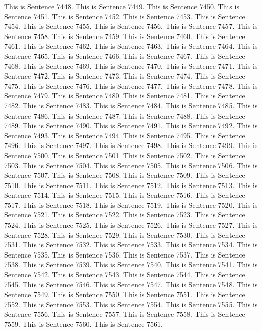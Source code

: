 \documentclass{article}
\begin{document}
This is Sentence 7448.
This is Sentence 7449.
This is Sentence 7450.
This is Sentence 7451.
This is Sentence 7452.
This is Sentence 7453.
This is Sentence 7454.
This is Sentence 7455.
This is Sentence 7456.
This is Sentence 7457.
This is Sentence 7458.
This is Sentence 7459.
This is Sentence 7460.
This is Sentence 7461.
This is Sentence 7462.
This is Sentence 7463.
This is Sentence 7464.
This is Sentence 7465.
This is Sentence 7466.
This is Sentence 7467.
This is Sentence 7468.
This is Sentence 7469.
This is Sentence 7470.
This is Sentence 7471.
This is Sentence 7472.
This is Sentence 7473.
This is Sentence 7474.
This is Sentence 7475.
This is Sentence 7476.
This is Sentence 7477.
This is Sentence 7478.
This is Sentence 7479.
This is Sentence 7480.
This is Sentence 7481.
This is Sentence 7482.
This is Sentence 7483.
This is Sentence 7484.
This is Sentence 7485.
This is Sentence 7486.
This is Sentence 7487.
This is Sentence 7488.
This is Sentence 7489.
This is Sentence 7490.
This is Sentence 7491.
This is Sentence 7492.
This is Sentence 7493.
This is Sentence 7494.
This is Sentence 7495.
This is Sentence 7496.
This is Sentence 7497.
This is Sentence 7498.
This is Sentence 7499.
This is Sentence 7500.
This is Sentence 7501.
This is Sentence 7502.
This is Sentence 7503.
This is Sentence 7504.
This is Sentence 7505.
This is Sentence 7506.
This is Sentence 7507.
This is Sentence 7508.
This is Sentence 7509.
This is Sentence 7510.
This is Sentence 7511.
This is Sentence 7512.
This is Sentence 7513.
This is Sentence 7514.
This is Sentence 7515.
This is Sentence 7516.
This is Sentence 7517.
This is Sentence 7518.
This is Sentence 7519.
This is Sentence 7520.
This is Sentence 7521.
This is Sentence 7522.
This is Sentence 7523.
This is Sentence 7524.
This is Sentence 7525.
This is Sentence 7526.
This is Sentence 7527.
This is Sentence 7528.
This is Sentence 7529.
This is Sentence 7530.
This is Sentence 7531.
This is Sentence 7532.
This is Sentence 7533.
This is Sentence 7534.
This is Sentence 7535.
This is Sentence 7536.
This is Sentence 7537.
This is Sentence 7538.
This is Sentence 7539.
This is Sentence 7540.
This is Sentence 7541.
This is Sentence 7542.
This is Sentence 7543.
This is Sentence 7544.
This is Sentence 7545.
This is Sentence 7546.
This is Sentence 7547.
This is Sentence 7548.
This is Sentence 7549.
This is Sentence 7550.
This is Sentence 7551.
This is Sentence 7552.
This is Sentence 7553.
This is Sentence 7554.
This is Sentence 7555.
This is Sentence 7556.
This is Sentence 7557.
This is Sentence 7558.
This is Sentence 7559.
This is Sentence 7560.
This is Sentence 7561.
\end{document}
